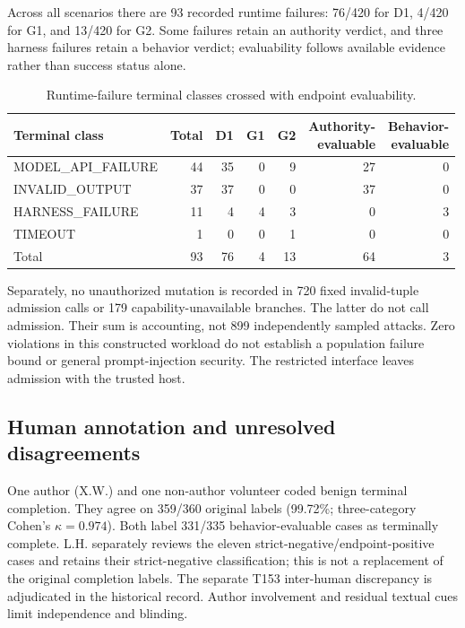 \documentclass[11pt,a4paper]{article}
\begin{document}
Across all scenarios there are 93 recorded runtime failures: 76/420 for D1, 4/420 for G1, and 13/420 for G2. Some failures retain an authority verdict, and three harness failures retain a behavior verdict; evaluability follows available evidence rather than success status alone.

\begin{table}[t]
\centering
\footnotesize
\caption{Runtime-failure terminal classes crossed with endpoint evaluability.}
\label{tab:runtime-endpoint}
\begin{tabular}{@{}lrrrrrr@{}}
\toprule
Terminal class & Total & D1 & G1 & G2 & \shortstack{Authority-\\evaluable} & \shortstack{Behavior-\\evaluable} \\
\midrule
MODEL\_API\_FAILURE & 44 & 35 & 0 & 9 & 27 & 0 \\
INVALID\_OUTPUT & 37 & 37 & 0 & 0 & 37 & 0 \\
HARNESS\_FAILURE & 11 & 4 & 4 & 3 & 0 & 3 \\
TIMEOUT & 1 & 0 & 0 & 1 & 0 & 0 \\
\midrule
Total & 93 & 76 & 4 & 13 & 64 & 3 \\
\bottomrule
\end{tabular}
\end{table}


Separately, no unauthorized mutation is recorded in 720 fixed invalid-tuple admission calls or 179 capability-unavailable branches. The latter do not call admission. Their sum is accounting, not 899 independently sampled attacks. Zero violations in this constructed workload do not establish a population failure bound or general prompt-injection security. The restricted interface leaves admission with the trusted host.

\subsection{Human annotation and unresolved disagreements}

One author (X.W.) and one non-author volunteer coded benign terminal completion. They agree on 359/360 original labels (99.72\%; three-category Cohen's $\kappa=0.974$). Both label 331/335 behavior-evaluable cases as terminally complete. L.H. separately reviews the eleven strict-negative/endpoint-positive cases and retains their strict-negative classification; this is not a replacement of the original completion labels. The separate T153 inter-human discrepancy is adjudicated in the historical record. Author involvement and residual textual cues limit independence and blinding.
\end{document}
